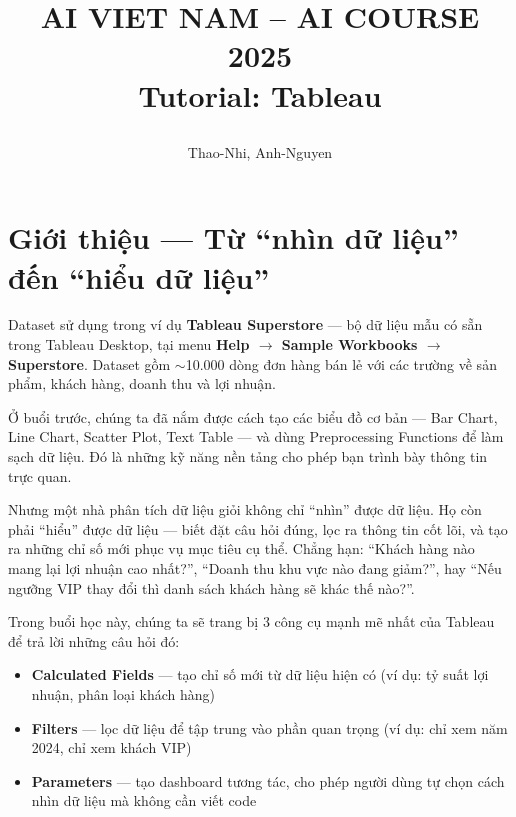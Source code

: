 \documentclass[12pt]{article}
\title{%
  \begin{center}
        \Large {AI VIET NAM -- AI COURSE 2025}\\[.5ex]  
        \Huge \textbf{Tutorial: Tableau}\\[.5ex]
  \end{center}
}
\author{
        \begin{minipage}{\textwidth}
        \centering
        {
          Thao-Nhi,\quad
          Anh-Nguyen
        }\\
      \end{minipage}
    }
\date{}
\begin{document}
\maketitle
\vspace{-3.5em}

\section{Giới thiệu --- Từ ``nhìn dữ liệu'' đến ``hiểu dữ liệu''}
\label{section:intro-advanced}

\begin{conceptbox}{Dataset sử dụng trong ví dụ}
\textbf{Tableau Superstore} --- bộ dữ liệu mẫu có sẵn trong Tableau Desktop, tại menu \textbf{Help $\rightarrow$ Sample Workbooks $\rightarrow$ Superstore}. Dataset gồm $\sim$10.000 dòng đơn hàng bán lẻ với các trường về sản phẩm, khách hàng, doanh thu và lợi nhuận.
\end{conceptbox}

\noindent Ở buổi trước, chúng ta đã nắm được cách tạo các biểu đồ cơ bản --- Bar Chart, Line Chart, Scatter Plot, Text Table --- và dùng Preprocessing Functions để làm sạch dữ liệu. Đó là những kỹ năng nền tảng cho phép bạn trình bày thông tin trực quan.

\noindent Nhưng một nhà phân tích dữ liệu giỏi không chỉ ``nhìn'' được dữ liệu. Họ còn phải ``hiểu'' được dữ liệu --- biết đặt câu hỏi đúng, lọc ra thông tin cốt lõi, và tạo ra những chỉ số mới phục vụ mục tiêu cụ thể. Chẳng hạn: ``Khách hàng nào mang lại lợi nhuận cao nhất?'', ``Doanh thu khu vực nào đang giảm?'', hay ``Nếu ngưỡng VIP thay đổi thì danh sách khách hàng sẽ khác thế nào?''.

\noindent Trong buổi học này, chúng ta sẽ trang bị 3 công cụ mạnh mẽ nhất của Tableau để trả lời những câu hỏi đó:

\begin{itemize}
    \item \textbf{Calculated Fields} --- tạo chỉ số mới từ dữ liệu hiện có (ví dụ: tỷ suất lợi nhuận, phân loại khách hàng)
    \item \textbf{Filters} --- lọc dữ liệu để tập trung vào phần quan trọng (ví dụ: chỉ xem năm 2024, chỉ xem khách VIP)
    \item \textbf{Parameters} --- tạo dashboard tương tác, cho phép người dùng tự chọn cách nhìn dữ liệu mà không cần viết code
\end{itemize}
\end{document}
